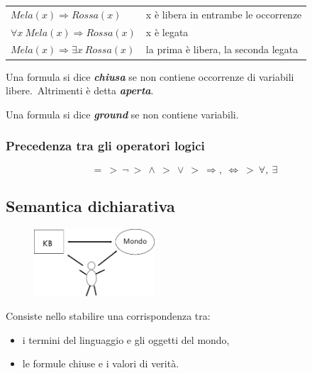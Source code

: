 \begin{table}[H]
	\centering
	\begin{tabular}{l l}
		$ Mela(x) \Rightarrow Rossa(x)$            & x è libera in entrambe le occorrenze \\
		$\forall x\ Mela(x) \Rightarrow Rossa(x) $ & x è legata                           \\
		$ Mela(x) \Rightarrow \exists x\ Rossa(x)$ & la prima è libera, la seconda legata \\
	\end{tabular}
\end{table}

\begin{definition}
	Una formula si dice \textbf{\textit{chiusa}} se non contiene occorrenze di variabili libere.\
	Altrimenti è detta \textbf{\textit{aperta}}.
\end{definition}

\begin{definition}
	Una formula si dice \textbf{\textit{ground}} se non contiene variabili.

\end{definition}

\subsubsection{Precedenza tra gli operatori logici}

\[
	=\ >\ \lnot\ >\ \land\ >\ \lor\ >\ \Rightarrow,\ \Leftrightarrow\ >\ \forall,\ \exists
\]

\subsection{Semantica dichiarativa}

\begin{figure}[H]
	\centering
	\includegraphics[width=0.4\textwidth]{immagini/Semantica_dichiarativa.png}
\end{figure}

Consiste nello stabilire una corrispondenza tra:
\begin{itemize}
	\item i termini del linguaggio e gli oggetti del mondo,
	\item le formule chiuse e i valori di verità.
\end{itemize}

